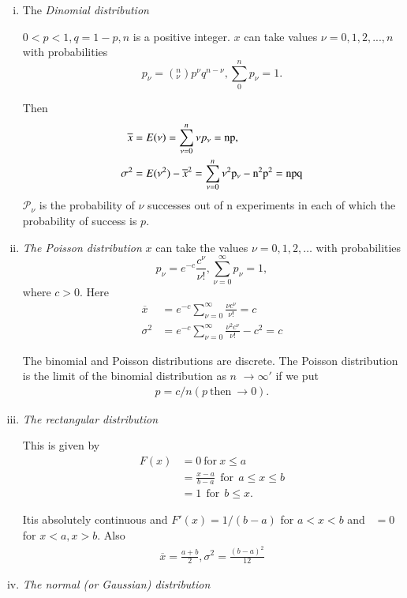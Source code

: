 \begin{enumerate}[(i)]
\item {The \textit{Dinomial distribution}} 

  $0 < p < 1, q =1 -p, n$ is a positive integer. $x$ can take
  values $\nu  = 0, 1, 2, ..., n$ with probabilities 
  $$
  p_{\nu} = (^n_\nu) p^\nu q^{n-\nu}, \sum\limits^{n}_{0} p_\nu = 1.
  $$\pageoriginale
  
  Then
  \begin{align*}
    \overline{x} & = E (\nu) =  \sum\limits^{n}_{\nu=0} \nu p_\nu = \rm np,\\
    \sigma^2 & = E (\nu^2) - \overline{x}^2 = \sum\limits^{n}_{\nu=0}
    \nu^2 \rm p_\nu - n^2 p^2 = n p q
  \end{align*}
  $\mathcal{P}_\nu$  is the probability of $\nu$  successes out of n
  experiments in each of which the probability of success is $p$. 
\item \textit{The Poisson distribution} $x$ can take the values $\nu = 0, 1,
  2, \ldots$ with probabilities 
  $$
  p_\nu = e^{-c}  \frac{c^\nu}{\nu !} , 
  \sum\limits^{\infty}_{\nu=0} p_\nu = 1,
  $$
  where $c > 0$. Here 
  \begin{align*}
    \overline{x}&= e^{-c} \sum\limits^{\infty}_{\nu=0} \frac{\nu
      c^\nu}{\nu !}= c\\ 
    \sigma^2 & = e^{-c} \sum\limits^{\infty}_{\nu=0} \frac{\nu^2
      c^\nu}{\nu !} -c^2 = c  
  \end{align*}
  
  The binomial and Poisson distributions are discrete. The Poisson
  distribution is the limit of the binomial distribution as $n$
  $\rightarrow\infty'$ if we put 
  \begin{align*}
    p=c/n (p ~\text{then}~ \rightarrow 0).
  \end{align*}
\item \textit{The rectangular distribution}
  
  This is given by 
  \begin{align*}
    F(x) &= 0 ~\text{for}~ x \leq  a\\
    &= \frac{x-a}{b-a} ~~\text{for}~~ a \leq x \leq b\\
    &= 1 ~~\text{for}~~ b \leq x.
  \end{align*}
  
  It\pageoriginale is absolutely continuous and $F' (x) = 1/(b - a)$ for $a < x < b$
  and ~$= 0$ for $x < a, x >b$. Also 
  \begin{align*}
    \overline{x}= \frac{a+b}{2}, \sigma^2 = \frac{(b-a)^2}{12}
  \end{align*}
\item \textit{The normal (or Gaussian) distribution}
  

\end{enumerate}
